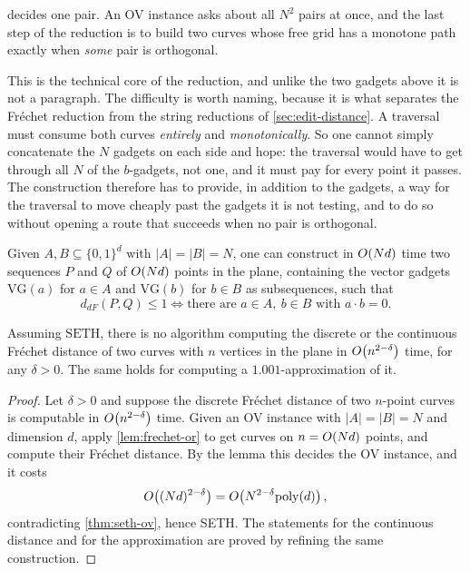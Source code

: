  decides one pair. An OV instance asks about
all $N^2$ pairs at once, and the last step of the reduction is to build two
curves whose free grid has a monotone path exactly when \emph{some} pair is
orthogonal.

This is the technical core of the reduction, and unlike the two gadgets above
it is not a paragraph. The difficulty is worth naming, because it is what
separates the Fr\'echet reduction from the string reductions of
\cref{sec:edit-distance}. A traversal must consume both curves \emph{entirely}
and \emph{monotonically}. So one cannot simply concatenate the $N$ gadgets on
each side and hope: the traversal would have to get through all $N$ of the
$b$-gadgets, not one, and it must pay for every point it passes. The
construction therefore has to provide, in addition to the gadgets, a way for
the traversal to move cheaply past the gadgets it is not testing, and to do so
without opening a route that succeeds when no pair is orthogonal.

\begin{lemma}\label{lem:frechet-or}
Given $A, B \subseteq \{0,1\}^d$ with $|A| = |B| = N$, one can construct in
$O\!\left(Nd\right)$ time two sequences $P$ and $Q$ of $O\!\left(Nd\right)$ points in the
plane, containing the vector gadgets $\mathrm{VG}(a)$ for $a \in A$ and
$\mathrm{VG}(b)$ for $b \in B$ as subsequences, such that
\[ d_{dF}(P,Q) \le 1 \iff \text{there are } a \in A,\ b \in B
   \text{ with } a \cdot b = 0 . \]
\end{lemma}

\begin{theorem}\label{thm:frechet}
Assuming $\mathrm{SETH}$, there is no algorithm computing the discrete or the
continuous Fr\'echet distance of two curves with $n$ vertices in the plane in
$O\!\left(n^{2-\delta}\right)$ time, for any $\delta > 0$. The same holds for computing
a $1.001$-approximation of it.
\end{theorem}

\begin{proof}
Let $\delta > 0$ and suppose the discrete Fr\'echet distance of two $n$-point
curves is computable in $O\!\left(n^{2-\delta}\right)$ time. Given an OV instance with
$|A| = |B| = N$ and dimension $d$, apply \cref{lem:frechet-or} to get curves on
$n = O\!\left(Nd\right)$ points, and compute their Fr\'echet distance. By the lemma
this decides the OV instance, and it costs
\[ O\!\left((Nd)^{2-\delta}\right) = O\!\left(N^{2-\delta} \mathrm{poly}(d)\right), \]
contradicting \cref{thm:seth-ov}, hence SETH. The statements for the continuous
distance and for the approximation are proved by refining the same
construction.
\end{proof}

